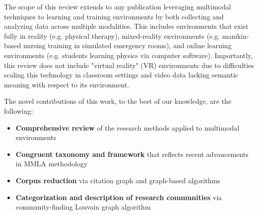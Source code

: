 \documentclass[manuscript,screen,review]{acmart}
\begin{document}
The scope of this review extends to any publication leveraging multimodal techniques to learning and training environments by both collecting and analyzing data across multiple modalities. This includes environments that exist fully in reality (e.g. physical therapy), mixed-reality environments (e.g. manikin-based nursing training in simulated emergency rooms), and online learning environments (e.g. students learning physics via computer software). Importantly, this review does not include "virtual reality" (VR) environments due to difficulties scaling this technology in classroom settings \cite{} and video data lacking semantic meaning with respect to its environment.

The novel contributions of this work, to the best of our knowledge, are the following: 
\begin{itemize}
    \item \textbf{Comprehensive review} of the research methods applied to multimodal environments
    \item \textbf{Congruent taxonomy and framework} that reflects recent advancements in MMLA methodology
    \item \textbf{Corpus reduction} via citation graph and graph-based algorithms
    \item \textbf{Categorization and description of research communities} via community-finding Louvain graph algorithm 
\end{itemize}
\end{document}
